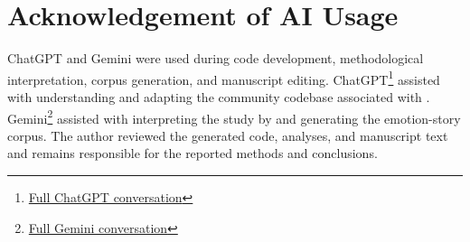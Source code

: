 \section{Acknowledgement of AI Usage}

ChatGPT and Gemini were used during code development, methodological interpretation, corpus generation, and manuscript 
editing. ChatGPT\footnote{\href{https://github.com/NotsoJharedtrollOx17/EmotionVectorExtraction-Gemma4-GPT2/blob/main/research_data/conversationChatGPT-Emotion-Mapping-Framework.md}{Full ChatGPT conversation}} 
assisted with understanding and adapting the community codebase associated with \cite{hsieh_replicating_2026}. 
Gemini\footnote{\href{https://github.com/NotsoJharedtrollOx17/EmotionVectorExtraction-Gemma4-GPT2/blob/main/research_data/conversationGemini-Replicating-Emotion-Vectors-in-LLMs.md}{Full Gemini conversation}} 
assisted with interpreting the study by \cite{sofroniew_emotion_2026} and generating the emotion-story corpus. The author 
reviewed the generated code, analyses, and manuscript text and remains responsible for the reported methods and conclusions.
